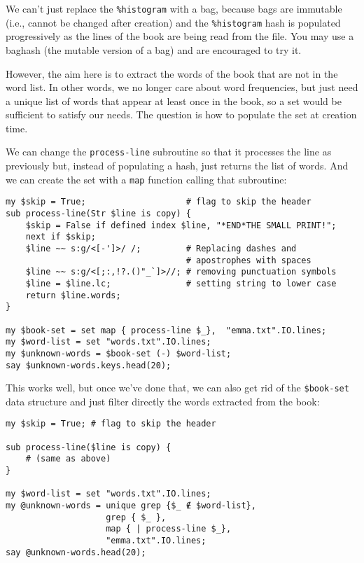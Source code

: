 We can't just replace the \verb'%histogram' with a bag, because 
bags are immutable (i.e., cannot be changed after creation) 
and the \verb'%histogram' hash is populated progressively as 
the lines of the book are being read from the file. You may use 
a baghash (the mutable version of a bag) and are encouraged 
to try it.

However, the aim here is to extract the words of the book that 
are not in the word list. In other words, we no longer care 
about word frequencies, but just need a unique list of words 
that appear at least once in the book, so a set would 
be sufficient to satisfy our needs. The question is how to 
populate the set at creation time.

We can change the {\tt process-line} subroutine so that it 
processes the line as previously but, instead of populating a 
hash, just returns the list of words. And we can create the 
set with a {\tt map} function calling that subroutine:

\begin{verbatim}
my $skip = True;                    # flag to skip the header
sub process-line(Str $line is copy) {
    $skip = False if defined index $line, "*END*THE SMALL PRINT!";
    next if $skip;
    $line ~~ s:g/<[-']>/ /;         # Replacing dashes and 
                                    # apostrophes with spaces
    $line ~~ s:g/<[;:,!?.()"_`]>//; # removing punctuation symbols
    $line = $line.lc;               # setting string to lower case
    return $line.words;
}

my $book-set = set map { process-line $_},  "emma.txt".IO.lines; 
my $word-list = set "words.txt".IO.lines;
my $unknown-words = $book-set (-) $word-list;
say $unknown-words.keys.head(20);
\end{verbatim}

This works well, but once we've done that, we can also 
get rid of the \verb'$book-set' data structure and 
just filter directly the words extracted from the book:

\begin{verbatim}
my $skip = True; # flag to skip the header

sub process-line($line is copy) {
    # (same as above)
}

my $word-list = set "words.txt".IO.lines;
my @unknown-words = unique grep {$_ ∉ $word-list}, 
                    grep { $_ }, 
                    map { | process-line $_},  
                    "emma.txt".IO.lines; 
say @unknown-words.head(20);
\end{verbatim}

